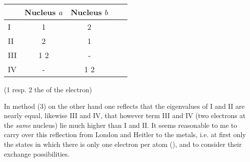 \documentclass{article}
\begin{document}
\begin{tabular}{l|cccc}
  & Nucleus $a$ & Nucleus $b$ \\
  \hline
 I & 1 & 2 \\
 II & 2 & 1 \\
 III & 1 2 & - \\
 IV  & -   & 1 2
\end{tabular}

(1 resp. 2 the  of the electron)

In method (3) on the other hand one reflects that the eigenvalues of I and II are nearly equal, likewise III and IV, that however term III and IV (two electrons at the \textit{same} nucleus) lie much higher than I and II. It seems reasonable to me to carry over this reflection from London and Heitler to the metals, i.e. at first only the states in which there is only one electron per atom (), and to consider their exchange possibilities.
\end{document}
